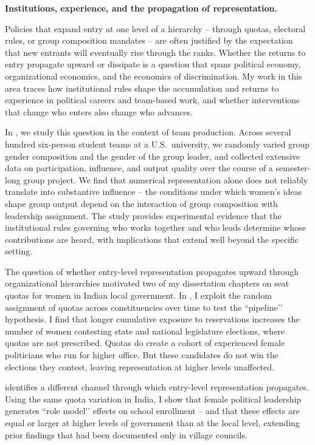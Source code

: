 \documentclass[10pt, letter]{article}
\begin{document}
\noindent \textbf{Institutions, experience, and the propagation of representation.}

Policies that expand entry at one level of a hierarchy -- through quotas, electoral rules, or group composition mandates -- are often justified by the expectation that new entrants will eventually rise through the ranks. Whether the returns to entry propagate upward or dissipate is a question that spans political economy, organizational economics, and the economics of discrimination. My work in this area traces how institutional rules shape the accumulation and returns to experience in political careers and team-based work, and whether interventions that change who enters also change who advances.

In , we study this question in the context of team production. Across several hundred six-person student teams at a U.S.\ university, we randomly varied group gender composition and the gender of the group leader, and collected extensive data on participation, influence, and output quality over the course of a semester-long group project. We find that numerical representation alone does not reliably translate into substantive influence -- the conditions under which women’s ideas shape group output depend on the interaction of group composition with leadership assignment. The study provides experimental evidence that the institutional rules governing who works together and who leads determine whose contributions are heard, with implications that extend well beyond the specific setting.

The question of whether entry-level representation propagates upward through organizational hierarchies motivated two of my dissertation chapters on seat quotas for women in Indian local government. In , I exploit the random assignment of quotas across constituencies over time to test the ``pipeline’’ hypothesis. I find that longer cumulative exposure to reservations increases the number of women contesting state and national legislature elections, where quotas are not prescribed. Quotas do create a cohort of experienced female politicians who run for higher office. But these candidates do not win the elections they contest, leaving representation at higher levels unaffected.

 identifies a different channel through which entry-level representation propagates. Using the same quota variation in India, I show that female political leadership generates ``role model’’ effects on school enrollment -- and that these effects are equal or larger at higher levels of government than at the local level, extending prior findings that had been documented only in village councils.
\end{document}
